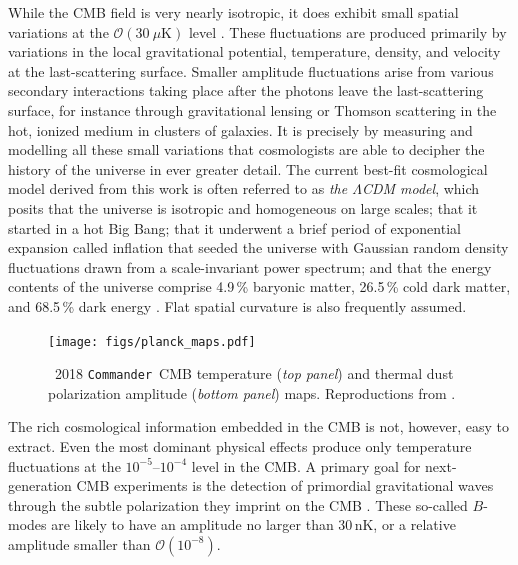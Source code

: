\documentclass[onecolumn]{aa}
\def\commander{\texttt{Commander}}
\begin{document}
While the CMB field is very nearly isotropic, it does exhibit small
spatial variations at the $\mathcal{O}(30~\mu\mathrm{K})$ level
\citep[e.g.,][and references therein]{hu:2002}. These fluctuations are
produced primarily by variations in the local gravitational potential,
temperature, density, and velocity at the last-scattering surface.
Smaller amplitude fluctuations arise from various secondary
interactions taking place after the photons leave the last-scattering
surface, for instance through gravitational lensing or Thomson
scattering in the hot, ionized medium in clusters of galaxies. It is
precisely by measuring and modelling all these small variations that
cosmologists are able to decipher the history of the universe in ever
greater detail. The current best-fit cosmological model derived from
this work is often referred to as \emph{the $\mathit\Lambda$CDM
  model}, which posits that the universe is isotropic and homogeneous
on large scales; that it started in a hot Big Bang; that it underwent
a brief period of exponential expansion called inflation that seeded
the universe with Gaussian random density fluctuations drawn from a
scale-invariant power spectrum; and that the energy contents of the
universe comprise 4.9\,\% baryonic matter, 26.5\,\% cold dark
matter, and 68.5\,\% dark energy \citep{planck2016-l06}. Flat spatial
curvature is also frequently assumed.

\begin{figure}[t]
  \center
  \texttt{[image: figs/planck\_maps.pdf]}
  \caption{\Planck\ 2018 \commander\ CMB temperature (\emph{top
      panel}) and thermal dust polarization amplitude (\emph{bottom
      panel}) maps. Reproductions from \citet{planck2016-l04}.    }\label{fig:planck_maps}
\end{figure}

The rich cosmological information embedded in the CMB is not, however,
easy to extract.  Even the most dominant physical effects produce only
temperature fluctuations at the $10^{-5}$--$10^{-4}$ level in the
CMB.  A primary goal for next-generation CMB experiments is the
detection of primordial gravitational waves through the subtle
polarization they imprint on the CMB \citep[e.g.,][and references
  therein]{kamionkowski:2016}.  These so-called $B$-modes are likely
to have an amplitude no larger than 30\,nK, or a relative amplitude
smaller than $\mathcal{O}(10^{-8})$.
\end{document}
